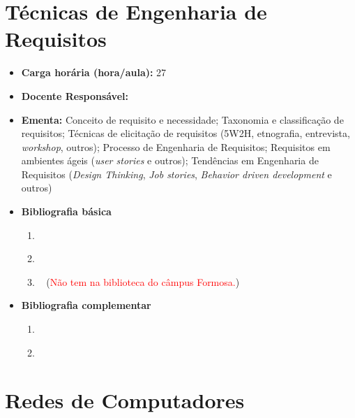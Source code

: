 \documentclass[11pt,fleqn]{book} %
\begin{document}


\newpage
\section{Técnicas de Engenharia de Requisitos}\label{disc:engreq}

\begin{itemize}
	\item \textbf{Carga horária (hora/aula):} 27
	\item \textbf{Docente Responsável:}~
	\item \textbf{Ementa:} 
	Conceito de requisito e necessidade;
	Taxonomia e classificação de requisitos;
	Técnicas de elicitação de requisitos (5W2H, etnografia, entrevista, \textit{workshop}, outros);
	Processo de Engenharia de Requisitos;
	Requisitos em ambientes ágeis (\textit{user stories} e outros);
	Tendências em Engenharia de Requisitos (\textit{Design Thinking}, \textit{Job stories}, \textit{Behavior driven development} e outros)
	
	\item \textbf{Bibliografia básica}
	\begin{enumerate}
		\item ~\cite{sommerville2011engenharia}
		\item ~\cite{pressman2016engenharia}
		\item ~\cite{prikladnicki2014metodos} (\textcolor{red}{Não tem na biblioteca do câmpus Formosa.})
	\end{enumerate}
	\item \textbf{Bibliografia complementar}
	\begin{enumerate}
		\item ~\cite{wazlawick2011analise}
		\item 
	\end{enumerate}
\end{itemize}



\newpage
\section{Redes de Computadores}\label{disc:redescomp}
\end{document}
